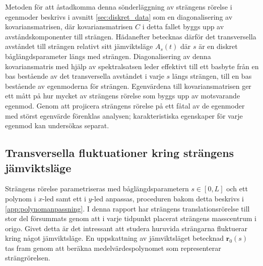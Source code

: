 Metoden för att åstadkomma denna sönderläggning av strängens rörelse i egenmoder beskrivs i avsnitt \ref{sec:diskret_data} som en diagonalisering av kovariansmatrisen, där kovariansmatrisen $C$ i detta fallet byggs upp av avståndskomponenter till strängen. Hädanefter betecknas därför det transversella avståndet till strängen relativt sitt jämviktsläge $A_s(t)$ där $s$ är en diskret båglängdsparameter längs med strängen. Diagonalisering av denna kovariansmatris med hjälp av spektralsatsen leder effektivt till ett basbyte från en bas bestående av det transversella avståndet i varje $s$ längs strängen, till en bas bestående av egenmoderna för strängen. Egenvärdena till kovariansmatrisen ger ett mått på hur mycket av strängens rörelse som byggs upp av motsvarande egenmod. Genom att projicera strängens rörelse på ett fåtal av de egenmoder med störst egenvärde förenklas analysen\cite{Shlens_PCA2014}; karakteristiska egenskaper för varje egenmod kan undersökas separat. 

\subsection{Transversella fluktuationer kring strängens jämviktsläge}
Strängens rörelse parametriseras med båglängdsparametern $s\in[0,L]$ och ett polynom i $x$-led samt ett i $y$-led anpassas, proceduren bakom detta beskrivs i \ref{app:polynomanpassning}. I denna rapport har strängens translationsrörelse till stor del försummats genom att i varje tidpunkt placerat strängens masscentrum i origo. Givet detta är det intressant att studera huruvida strängarna fluktuerar kring något jämviktsläge. En uppskattning av jämviktsläget betecknad $\mathbf{r}_0(s)$ tas fram genom att beräkna medelvärdespolynomet som representerar strängrörelsen. 

